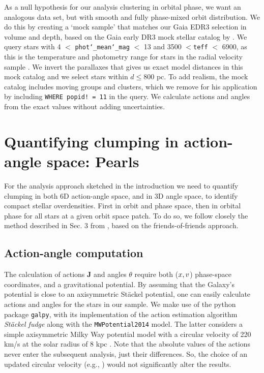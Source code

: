 \documentclass[twocolumn]{aastex631}
\begin{document}
As a null hypothesis for our analysis clustering in orbital phase, we want an analogous data set, but with smooth and fully phase-mixed orbit distribution. We do this by creating a `mock sample' that matches our Gaia EDR3 selection in volume and depth, based on the Gaia early DR3 mock stellar catalog by \citet{2020PASP..132g4501R}. We query stars with %
 4 $<$ \texttt{phot\char`_mean\char`_mag} $<$ 13 and 3500 $<$\texttt{teff} $<$ 6900, as this is the temperature and photometry range for stars in the radial velocity sample \citep{2019A&A...622A.205K}. We invert the parallaxes that gives us exact model distances in this mock catalog \citep{2018PASP..130g4101R} and we select stars within $d \leq 800$ pc. To add realism, the mock catalog \citet{2020PASP..132g4501R} includes moving groups and clusters, which we remove for his application by including \texttt{WHERE popid! = 11} in the query. We calculate actions and angles from the exact values without adding uncertainties. 

\section{Quantifying clumping in action-angle space: Pearls}
\label{sec:clumps_actions_angles}

For the analysis approach sketched in the introduction we need to quantify clumping in both 6D action-angle space, and in 3D angle space, to identify compact stellar overdensities. First in orbit and phase space, then in orbital phase for all stars at a given orbit space patch. To do so, we follow closely the method described in Sec. 3 from \citet{2020MNRAS.495.4098C}, based on the friends-of-friends approach. 

\subsection{Action-angle computation}
\label{sec:action_angle_comp}
The calculation of actions {\bf J} and angles $\theta$ require both ($\mathnormal{x,v}$) phase-space coordinates, and a gravitational potential. By assuming that the Galaxy's potential is close to an axisymmetric St{\"a}ckel potential, one can easily calculate actions and angles for the stars in our sample. We make use of the python package \texttt{galpy}, with its implementation of the action estimation algorithm \emph{St{\"a}ckel fudge} \citep{2012MNRAS.426.1324B} along with the \texttt{MWPotential2014} model. The latter considers a simple axisymmetric Milky Way potential model with a circular velocity of 220 km/s at the solar radius of 8 kpc \citep{galpy}. Note that the absolute values of the actions never enter the subsequent analysis, just their differences. So, the choice of an updated circular velocity (e.g., \citet{2019ApJ...871..120E}) would not significantly alter the results.
\end{document}
